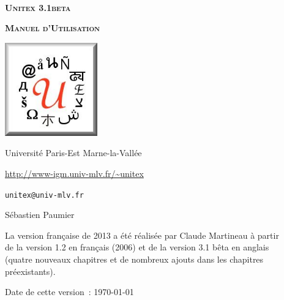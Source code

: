 
\begin{titlepage}
\begin{center}

~

\vspace{3cm}
\Huge
\textsc{\textbf{Unitex 3.1beta}}

\vspace{1cm}

\huge
\textsc{\textbf{Manuel d'Utilisation}}

\vspace{2cm}

  \begin{center}
    \includegraphics[width=4cm]{resources/img/logo-Unitex.png}
  \end{center}
\normalsize

\vspace{2cm}

\LARGE

Université Paris-Est Marne-la-Vallée
\bigskip
\normalsize

\url{http://www-igm.univ-mlv.fr/~unitex}

\verb$unitex@univ-mlv.fr$

\vspace{1cm}

Sébastien Paumier
\bigskip

La version française de 2013 a été réalisée par Claude Martineau à partir\\
de la version 1.2 en français (2006) et de la version 3.1 bêta en anglais \\
(quatre nouveaux chapitres et de nombreux ajouts dans les chapitres préexistants).
\bigskip

\mydate
Date de cette version~: \today

\end{center}

\end{titlepage}
